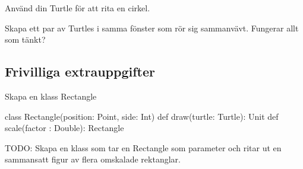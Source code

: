 \Subtask Använd din Turtle för att rita en cirkel.

\Subtask Skapa ett par av Turtles i samma fönster som rör sig sammanvävt. Fungerar allt som tänkt?

\subsection{Frivilliga extrauppgifter}

\Task Skapa en klass Rectangle
\begin{Code}
class Rectangle(position: Point, side: Int) {
  def draw(turtle: Turtle): Unit
  def scale(factor : Double): Rectangle
}
\end{Code}

\Task TODO: Skapa en klass som tar en Rectangle som parameter och ritar ut en sammansatt figur av flera omskalade rektanglar.
